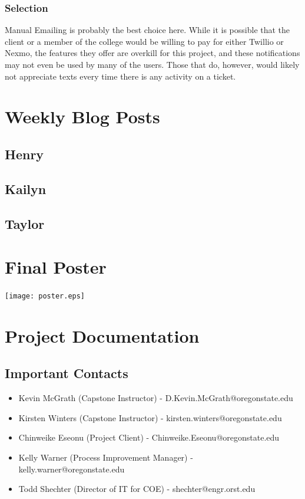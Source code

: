 \documentclass[onecolumn, draftclsnofoot,10pt, compsoc]{IEEEtran}
\begin{document}
\subsubsection{Selection}
Manual Emailing is probably the best choice here. While it is possible that the client or a member of the college would be willing to pay for either Twillio or Nexmo, the features they offer are overkill
for this project, and these notifications may not even be used by many of the users. Those that do, however, would likely not appreciate texts every time there is any activity on a ticket.


\newpage
\section{Weekly Blog Posts}

\subsection{Henry}

\subsection{Kailyn}

\subsection{Taylor}

\newpage
\section{Final Poster}

\texttt{[image: poster.eps]}

\newpage
\section{Project Documentation}

\subsection{Important Contacts}
\begin{itemize}
\item Kevin McGrath (Capstone Instructor) - D.Kevin.McGrath@oregonstate.edu
\item Kirsten Winters (Capstone Instructor) - kirsten.winters@oregonstate.edu
\item Chinweike Eseonu (Project Client) - Chinweike.Eseonu@oregonstate.edu
\item Kelly Warner (Process Improvement Manager) - kelly.warner@oregonstate.edu
\item Todd Shechter (Director of IT for COE) - shechter@engr.orst.edu
\end{itemize}
\end{document}
